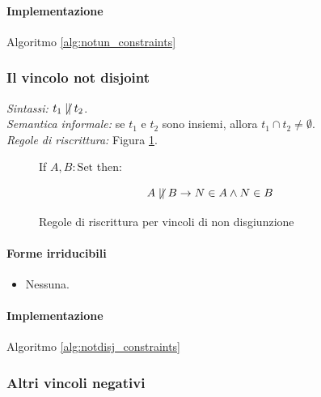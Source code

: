 \documentclass[12pt,a4paper,openright]{book} %
\begin{document}
\paragraph{Implementazione}
Algoritmo \ref{alg:notun_constraints}

\subsubsection{Il vincolo not disjoint}

\textit{Sintassi:} $t_1 \not\mid\mid t_2$.\\
\noindent\textit{Semantica informale:} se $t_1$ e $t_2$ sono insiemi, allora $t_1 \cap t_2 \neq \emptyset$.\\
\noindent\textit{Regole di riscrittura:} Figura \ref{fig:notdisj_constraints}.

\begin{figure}
	\begin{tcolorbox}[colframe=black, colback=white, sharp corners]
		\setcounter{equation}{6}
		\renewcommand{\theequation}{$\mid\mid$\textsubscript{\arabic{equation}}}

		If $A, B: \text{Set}$ then:

		\begin{equation}
		A \not\mid\mid B \to N \in A \land N \in B
		\end{equation}

	\end{tcolorbox}

	\caption{Regole di riscrittura per vincoli di non disgiunzione}
	\label{fig:notdisj_constraints}
\end{figure}

\paragraph{Forme irriducibili}
\begin{itemize}
	\item Nessuna.
\end{itemize}

\paragraph{Implementazione}
Algoritmo \ref{alg:notdisj_constraints}

\subsubsection{Altri vincoli negativi}
\end{document}
